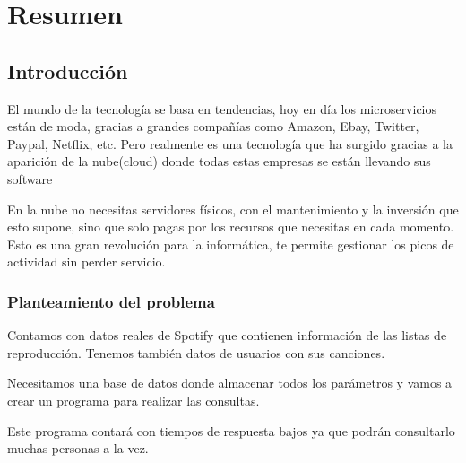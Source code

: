 \documentclass[12pt]{report} %
\begin{document}
\newpage %
\thispagestyle{empty}
\mbox{}

\listoffigures
\thispagestyle{fancy}

\newpage %
\thispagestyle{empty}
\mbox{}

\listoftables
\thispagestyle{fancy}

\newpage %
\thispagestyle{empty}
\mbox{}


\clearpage
{} %

\chapter{Resumen}
\section{Introducción}
	El mundo de la tecnología se basa en tendencias, hoy en día los microservicios están de moda, gracias a grandes compañías como Amazon, Ebay, Twitter, Paypal, Netflix, etc. Pero realmente es una tecnología que ha surgido gracias a la aparición de la nube(cloud) donde todas estas empresas se están llevando sus software
	
	En la nube no necesitas servidores físicos, con el mantenimiento y la inversión que esto supone, sino que solo pagas por los recursos que necesitas en cada momento. Esto es una gran revolución para la informática, te permite gestionar los picos de actividad sin perder servicio.
	
	
	\subsection{Planteamiento del problema}
	Contamos con datos reales de Spotify que contienen información de las listas de reproducción.
	Tenemos también datos de usuarios con sus canciones.

	Necesitamos una base de datos donde almacenar todos los parámetros y vamos a crear un programa para realizar las consultas.	
		
	Este programa contará con tiempos de respuesta bajos ya que podrán consultarlo muchas personas a la vez.
		
\end{document}

